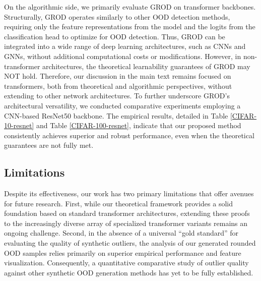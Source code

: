 \documentclass{article}
\theoremstyle{plain}
\theoremstyle{definition}
\theoremstyle{remark}
\begin{document}
On the algorithmic side, we primarily evaluate \textsc{GROD} on transformer backbones. Structurally, \textsc{GROD} operates similarly to other OOD detection methods, requiring only the feature representations from the model and the logits from the classification head to optimize for OOD detection. Thus, \textsc{GROD} can be integrated into a wide range of deep learning architectures, such as CNNs and GNNs, without additional computational costs or modifications. However, in non-transformer architectures, the theoretical learnability guarantees of \textsc{GROD} may NOT hold. Therefore, our discussion in the main text remains focused on transformers, both from theoretical and algorithmic perspectives, without extending to other network architectures. To further underscore \textsc{GROD}'s architectural versatility, we conducted comparative experiments employing a CNN-based ResNet50 backbone. The empirical results, detailed in Table \ref{CIFAR-10-resnet} and Table \ref{CIFAR-100-resnet}, indicate that our proposed method consistently achieves superior and robust performance, even when the theoretical guarantees are not fully met.

\subsection{Limitations}
Despite its effectiveness, our work has two primary limitations that offer avenues for future research. First, while our theoretical framework provides a solid foundation based on standard transformer architectures, extending these proofs to the increasingly diverse array of specialized transformer variants remains an ongoing challenge. Second, in the absence of a universal ``gold standard'' for evaluating the quality of synthetic outliers, the analysis of our generated rounded OOD samples relies primarily on superior empirical performance and feature visualization. Consequently, a quantitative comparative study of outlier quality against other synthetic OOD generation methods has yet to be fully established.
\end{document}
